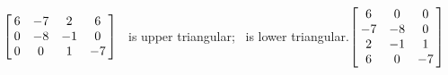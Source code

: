 {$\left[\hskip -3pt \begin{array}{cccc} 6&-7&2&6\\  0&-8&-1&0
\\  0&0&1&-7\end{array}\hskip -3pt \right]$} 
{\tta\ is upper triangular; \ttat\ is lower triangular.$\left[\hskip -3pt \begin{array}{ccc} 6&0&0\\  -7&-8&0
\\  2&-1&1\\  6&0&-7\end {array} \hskip -3pt
 \right] $}


  

